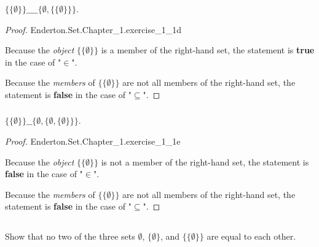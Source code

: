 \documentclass{report}
\begin{document}
\subsubsection{}%
\label{ssub:exercise-1.1d}

$\{\{\emptyset\}\} \_\_\_\_ \{\emptyset, \{\{\emptyset\}\}\}$.

\begin{proof}

    {Enderton.Set.Chapter\_1.exercise\_1\_1d}

  Because the \textit{object} $\{\{\emptyset\}\}$ is a member of the right-hand
    set, the statement is \textbf{true} in the case of "$\in$".

  Because the \textit{members} of $\{\{\emptyset\}\}$ are not all members of the
    right-hand set, the statement is \textbf{false} in the case of
    "$\subseteq$".

\end{proof}

\subsubsection{}%
\label{ssub:exercise-1.1e}

$\{\{\emptyset\}\} \_\_ \{\emptyset, \{\emptyset, \{\emptyset\}\}\}$.

\begin{proof}

    {Enderton.Set.Chapter\_1.exercise\_1\_1e}

  Because the \textit{object} $\{\{\emptyset\}\}$ is not a member of the
    right-hand set, the statement is \textbf{false} in the case of "$\in$".

  Because the \textit{members} of $\{\{\emptyset\}\}$ are not all members of the
    right-hand set, the statement is \textbf{false} in the case of
    "$\subseteq$".

\end{proof}

\subsection{}%
\label{sub:exercise-1.2}

Show that no two of the three sets $\emptyset$, $\{\emptyset\}$, and
  $\{\{\emptyset\}\}$ are equal to each other.
\end{document}
